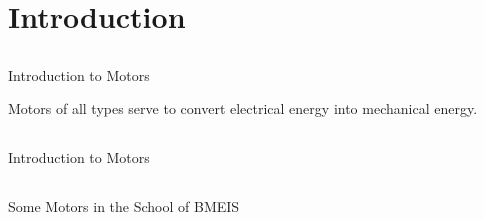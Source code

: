 \section{Introduction}

%
%
%
%
%
%
%

\subsection{}
{
\begin{frame}{Introduction to Motors}

\LARGE 
Motors of all types serve to convert electrical energy into mechanical energy. 



\end{frame}
}


\subsection{}
{
\begin{frame}{Introduction to Motors}

	\vspace{-3mm}
  	\begin{figure}
   	\end{figure}


\end{frame}
}




\subsection{}
{
\begin{frame}{Some Motors in the School of BMEIS}

	\vspace{-3mm}
   	\begin{figure}
 	\end{figure}


\end{frame}
}


